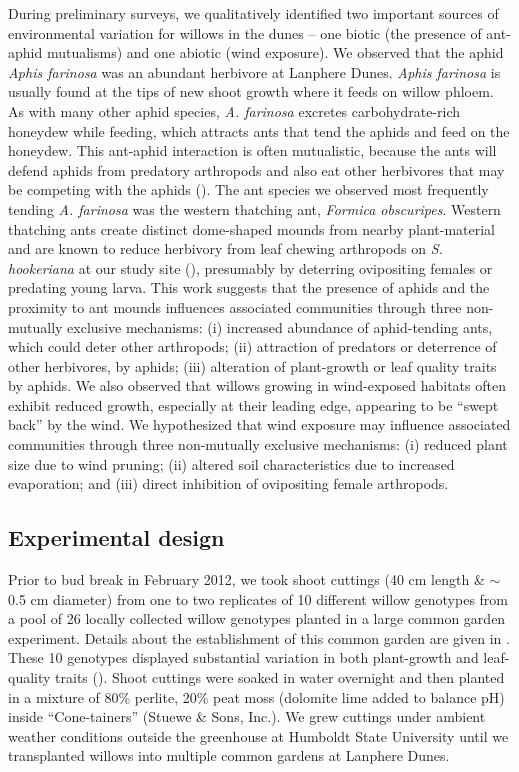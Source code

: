 \documentclass[11pt]{article}
\begin{document}
During preliminary surveys, we qualitatively identified two important
sources of environmental variation for willows in the dunes -- one
biotic (the presence of ant-aphid mutualisms) and one abiotic (wind
exposure). We observed that the aphid \emph{Aphis farinosa} was an
abundant herbivore at Lanphere Dunes. \emph{Aphis farinosa} is usually
found at the tips of new shoot growth where it feeds on willow phloem.
As with many other aphid species, \emph{A. farinosa} excretes
carbohydrate-rich honeydew while feeding, which attracts ants that tend
the aphids and feed on the honeydew. This ant-aphid interaction is often
mutualistic, because the ants will defend aphids from predatory
arthropods and also eat other herbivores that may be competing with the
aphids (\citealt{Floate_1994, Mooney_2008}). The ant species we observed
most frequently tending \emph{A. farinosa} was the western thatching
ant, \emph{Formica obscuripes}. Western thatching ants create distinct
dome-shaped mounds from nearby plant-material and are known to reduce
herbivory from leaf chewing arthropods on \emph{S. hookeriana} at our
study site (\citealt{CRUTSINGER_2005}), presumably by deterring ovipositing
females or predating young larva. This work suggests that the presence
of aphids and the proximity to ant mounds influences associated
communities through three non-mutually exclusive mechanisms: (i)
increased abundance of aphid-tending ants, which could deter other
arthropods; (ii) attraction of predators or deterrence of other
herbivores, by aphids; (iii) alteration of plant-growth or leaf quality
traits by aphids. We also observed that willows growing in wind-exposed
habitats often exhibit reduced growth, especially at their leading edge,
appearing to be ``swept back'' by the wind. We hypothesized that wind
exposure may influence associated communities through three non-mutually
exclusive mechanisms: (i) reduced plant size due to wind pruning; (ii)
altered soil characteristics due to increased evaporation; and (iii)
direct inhibition of ovipositing female arthropods.

\subsection*{Experimental design}

Prior to bud break in February 2012, we took shoot cuttings (40 cm
length \& $\sim$0.5 cm diameter) from one to two replicates
of 10 different willow genotypes from a pool of 26 locally collected
willow genotypes planted in a large common garden experiment. Details
about the establishment of this common garden are given in
\cite{Barbour_2015}. These 10 genotypes displayed substantial variation in
both plant-growth and leaf-quality traits (\citealt{Barbour_2015}). Shoot
cuttings were soaked in water overnight and then planted in a mixture of
80\% perlite, 20\% peat moss (dolomite lime added to balance pH) inside
``Cone-tainers'' (Stuewe \& Sons, Inc.). We grew cuttings under ambient
weather conditions outside the greenhouse at Humboldt State University
until we transplanted willows into multiple common gardens at Lanphere
Dunes.
\end{document}
